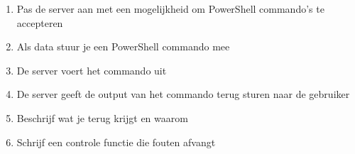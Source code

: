 \begin{enumerate}
\item Pas de server aan met een mogelijkheid om PowerShell commando's te accepteren
\item Als data stuur je een PowerShell commando mee
\item De server voert het commando uit
\item De server geeft de output van het commando terug sturen naar de gebruiker
\item Beschrijf wat je terug krijgt en waarom
\item Schrijf een controle functie die fouten afvangt
\end{enumerate}


